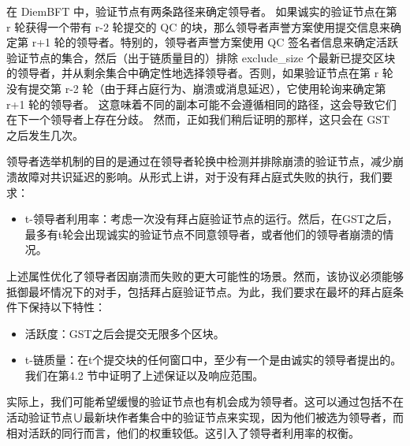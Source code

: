 在 DiemBFT 中，验证节点有两条路径来确定领导者。 如果诚实的验证节点在第 r 轮获得一个带有 r-2 轮提交的 QC 的块，那么领导者声誉方案使用提交信息来确定第 r+1 轮的领导者。特别的，领导者声誉方案使用 QC 签名者信息来确定活跃验证节点的集合，然后（出于链质量目的）排除 exclude\_size 个最新已提交区块的领导者，并从剩余集合中确定性地选择领导者。否则，如果验证节点在第 r 轮没有提交第 r-2 轮（由于拜占庭行为、崩溃或消息延迟），它使用轮询来确定第 r+1 轮的领导者。 这意味着不同的副本可能不会遵循相同的路径，这会导致它们在下一个领导者上存在分歧。 然而，正如我们稍后证明的那样，这只会在 GST 之后发生几次。

领导者选举机制的目的是通过在领导者轮换中检测并排除崩溃的验证节点，减少崩溃故障对共识延迟的影响。从形式上讲，对于没有拜占庭式失败的执行，我们要求：

\begin{itemize}
    \item t-领导者利用率：考虑一次没有拜占庭验证节点的运行。然后，在GST之后，最多有t轮会出现诚实的验证节点不同意领导者，或者他们的领导者崩溃的情况。
\end{itemize}

上述属性优化了领导者因崩溃而失败的更大可能性的场景。然而，该协议必须能够抵御最坏情况下的对手，包括拜占庭验证节点。为此，我们要求在最坏的拜占庭条件下保持以下特性：

\begin{itemize}
    \item 活跃度：GST之后会提交无限多个区块。
    \item t-链质量：在t个提交块的任何窗口中，至少有一个是由诚实的领导者提出的。我们在第4.2 节中证明了上述保证以及响应范围。
\end{itemize}

实际上，我们可能希望缓慢的验证节点也有机会成为领导者。这可以通过包括不在活动验证节点∪最新块作者集合中的验证节点来实现，因为他们被选为领导者，而相对活跃的同行而言，他们的权重较低。这引入了领导者利用率的权衡。